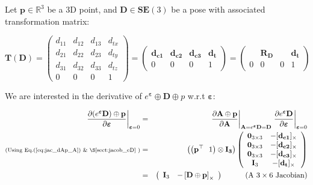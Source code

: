 \documentclass[a4paper,11pt]{report}
\newcommand{\E}{{\bm{\varepsilon}}}
\begin{document}
Let $\mathbf{p} \in \mathbb{R}^3$ be a 3D point, and 
$\mathbf{D} \in \mathbf{SE}(3)$ be a pose with associated transformation matrix:

\begin{equation}
\mathbf{T}(\mathbf{D}) = 
\left(
\begin{array}{ccc|c}
 d_{11} & d_{12} & d_{13} & d_{tx}   \\
 d_{21} & d_{22} & d_{23} & d_{ty}   \\
 d_{31} & d_{32} & d_{33} & d_{tz}   \\
\hline
  0 & 0 & 0 & 1
\end{array}
\right) 
=
\left(
\begin{array}{ccc|c}
 \mathbf{d_{c1}}  & \mathbf{d_{c2}}  & \mathbf{d_{c3}}  & \mathbf{d_{t}}  \\
\hline
  0 & 0 & 0 & 1
\end{array}
\right)
= 
\left(
\begin{array}{ccc|c}
   & \mathbf{R_D}  &  & \mathbf{d_{t}}  \\
\hline
  0 & 0 & 0 & 1
\end{array}
\right)
\end{equation}

We are interested in the derivative of $e^\E \oplus \mathbf{D} \oplus p$ w.r.t $\E$:

\begin{eqnarray}
\left. \frac{\partial (e^\E \mathbf{D}) \oplus \mathbf{p} }{\partial \E} \right|_{\E = 0}
&=& 
\left. \frac{\partial \mathbf{A} \oplus \mathbf{p}}{\partial \mathbf{A} } \right|_{\mathbf{A}=e^\E \mathbf{D} = \mathbf{D}}
\left. \frac{\partial e^\E \mathbf{D}}{\partial \E} \right|_{\E=0}
\\
\text{\scriptsize{(Using Eq.(\ref{eq:jac_dAp_A}) \& \S\ref{sect:jacob_eD}} )} &=&
\left(\left( \mathbf{p}^\top ~~ 1 \right) \otimes \mathbf{I_3} \right)
\left(
\begin{array}{cc}
 \mathbf{0}_{3\times 3}  & -[\mathbf{d_{c1}}]_\times \\
 \mathbf{0}_{3\times 3}  & -[\mathbf{d_{c2}}]_\times \\
 \mathbf{0}_{3\times 3}  & -[\mathbf{d_{c3}}]_\times \\
 \mathbf{I}_{3}  & -[\mathbf{d_{t}}]_\times \\
\end{array}
\right)
\\
\label{eq:jacob_eDp_e}
&=& 
\left(
\begin{array}{cc}
 \mathbf{I}_3   & - \left[ \mathbf{D} \oplus \mathbf{p} \right]_\times
\end{array}
\right)
\quad\quad\quad \text{(A $3 \times 6$ Jacobian)}
\end{eqnarray}
\end{document}
